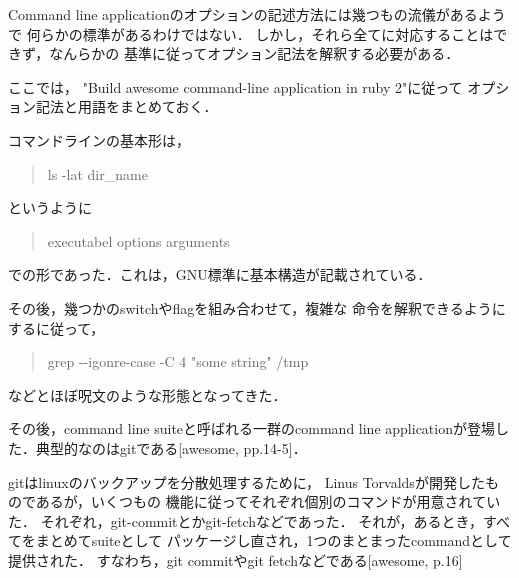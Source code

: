 Command line
applicationのオプションの記述方法には幾つもの流儀があるようで
何らかの標準があるわけではない．
しかし，それら全てに対応することはできず，なんらかの
基準に従ってオプション記法を解釈する必要がある．

ここでは， "Build awesome command-line application in ruby 2"に従って
オプション記法と用語をまとめておく．

コマンドラインの基本形は，

\begin{quote}
ls -lat dir\_name
\end{quote}
というように

\begin{quote}
executabel options arguments
\end{quote}
での形であった．これは，GNU標準に基本構造が記載されている．

その後，幾つかのswitchやflagを組み合わせて，複雑な
命令を解釈できるようにするに従って，

\begin{quote}
grep -\/-igonre-case -C 4 "some string" /tmp
\end{quote}
などとほぼ呪文のような形態となってきた．

その後，command line suiteと呼ばれる一群のcommand line
applicationが登場した．典型的なのはgitである{[}awesome, pp.14-5{]}．

gitはlinuxのバックアップを分散処理するために， Linus
Torvaldsが開発したものであるが，いくつもの
機能に従ってそれぞれ個別のコマンドが用意されていた．
それぞれ，git-commitとかgit-fetchなどであった．
それが，あるとき，すべてをまとめてsuiteとして
パッケージし直され，1つのまとまったcommandとして提供された．
すなわち，git commitやgit fetchなどである{[}awesome, p.16{]}

    